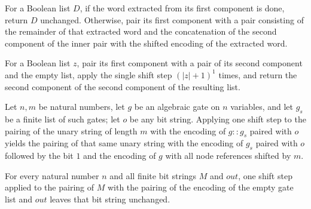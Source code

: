 \begin{definition}
\label{Randomized.PIT.shStep}
\leanok
{}
For a Boolean list $D$, if the word extracted from its first component is done, return
$D$ unchanged. Otherwise, pair its first component with a pair consisting of the
remainder of that extracted word and the concatenation of the second component of the
inner pair with the shifted encoding of the extracted word.
\end{definition}

\begin{definition}
\label{Randomized.PIT.shiftRun}
\leanok
{}
For a Boolean list $z$, pair its first component with a pair of its second component and
the empty list, apply the single shift step $ (|z|+1)^1$ times, and return the second
component of the second component of the resulting list.
\end{definition}

\begin{theorem}
\label{Randomized.PIT.shStep_cons}
\leanok
{}
Let $n,m$ be natural numbers, let $g$ be an algebraic gate on $n$ variables, and let
$g_s$ be a finite list of such gates; let $o$ be any bit string. Applying one shift step
to the pairing of the unary string of length $m$ with the encoding of $g :: g_s$ paired
with $o$ yields the pairing of that same unary string with the encoding of $g_s$ paired
with $o$ followed by the bit $1$ and the encoding of $g$ with all node references
shifted by $m$.
\end{theorem}

\begin{theorem}
\label{Randomized.PIT.shStep_nil}
\leanok
{}
For every natural number $n$ and all finite bit strings $M$ and $out$, one shift step
applied to the pairing of $M$ with the pairing of the encoding of the empty gate list
and $out$ leaves that bit string unchanged.
\end{theorem}

